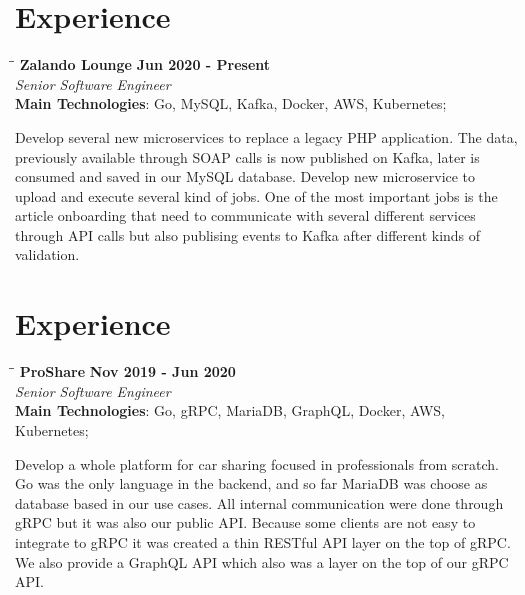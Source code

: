 \documentclass[margin]{res}
\begin{document}
\begin{resume}
\section{Experience}
\vspace{-0.1in}
    \begin{tabbing}
    \hspace{2.3in}\= \hspace{1.7in}\= \kill %
    \textbf{Zalando Lounge}    \>\>\textbf{Jun 2020 - Present}\\
    \textit{Senior Software Engineer}\\
    \textbf{Main Technologies}: Go, MySQL, Kafka, Docker, AWS, Kubernetes;
    \end{tabbing}\vspace{-20pt}      %
    \vspace{2mm}
Develop several new microservices to replace a legacy PHP application. The data, previously available through SOAP calls is now published on Kafka, later is consumed and saved in our MySQL database. Develop new microservice to upload and execute several kind of jobs. One of the most important jobs is the article onboarding that need to communicate with several different services through API calls but also publising events to Kafka after different kinds of validation.

\section{Experience}
\vspace{-0.1in}
    \begin{tabbing}
    \hspace{2.3in}\= \hspace{1.7in}\= \kill %
    \textbf{ProShare}    \>\>\textbf{Nov 2019 - Jun 2020}\\
    \textit{Senior Software Engineer}\\
    \textbf{Main Technologies}: Go, gRPC, MariaDB, GraphQL, Docker, AWS, Kubernetes;
    \end{tabbing}\vspace{-20pt}      %
    \vspace{2mm}
Develop a whole platform for car sharing focused in professionals from scratch. Go was the only language in the backend, and so far MariaDB was choose as database based in our use cases. All internal communication were done through gRPC but it was also our public API. Because some clients are not easy to integrate to gRPC it was created a thin RESTful API layer on the top of gRPC. We also provide a GraphQL API which also was a layer on the top of our gRPC API.


\end{resume}
\end{document}

